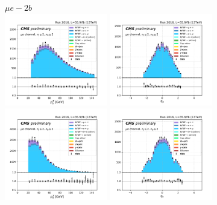 \begin{figure}[ht]
    \centering
    $ \mu e- 2b$ \\
    \includegraphics[width=0.4\textwidth]{chapters/Analysis/sectionPlots/figures/kinematics_pickles/emu/2b/emu_2b_lepton1_pt.pdf}
    \includegraphics[width=0.4\textwidth]{chapters/Analysis/sectionPlots/figures/kinematics_pickles/emu/2b/emu_2b_lepton1_eta.pdf}
    \includegraphics[width=0.4\textwidth]{chapters/Analysis/sectionPlots/figures/kinematics_pickles/emu/2b/emu_2b_lepton2_pt.pdf}
    \includegraphics[width=0.4\textwidth]{chapters/Analysis/sectionPlots/figures/kinematics_pickles/emu/2b/emu_2b_lepton2_eta.pdf}

\end{figure}
